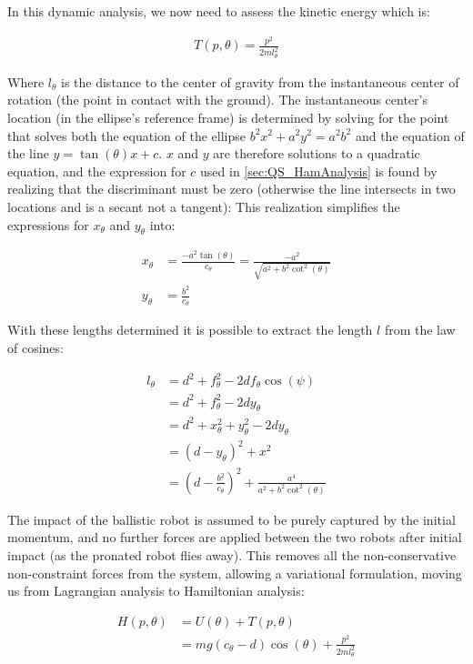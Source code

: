 \documentclass[letterpaper, 10 pt, conference]{ieeeconf}
\begin{document}
In this dynamic analysis, we now need to assess the kinetic energy which is:

\begin{align}
  T(p,\theta) = \frac{p^2}{2ml_\theta^2}
\end{align}

Where $l_\theta$ is the distance to the center of gravity from the instantaneous center of rotation (the point in contact with the ground).
The instantaneous center's location (in the ellipse's reference frame) is determined by solving for the point that solves both the equation of the ellipse $b^2 x^2 + a^2 y^2 = a^2 b^2$ and the equation of the line $y = \tan(\theta) x + c$.
$x$ and $y$ are therefore solutions to a quadratic equation, and the expression for $c$ used in \ref{sec:QS_HamAnalysis} is found by realizing that the discriminant must be zero (otherwise the line intersects in two locations and is a secant not a tangent):
This realization simplifies the expressions for $x_\theta$ and $y_\theta$ into:

\begin{align}
  x_\theta &= \frac{-a^2 \tan(\theta)}{c_\theta} = \frac{-a^2}{\sqrt{a^2 + b^2 \cot^2(\theta)}}\\
  y_\theta &= \frac{b^2}{c_\theta}
\end{align}

With these lengths determined it is possible to extract the length $l$ from the law of cosines:

\begin{align}
  l_\theta &= d^2 + f_\theta^2 - 2 d f_\theta \cos(\psi) \\
  &= d^2 + f_\theta^2 - 2 d y_\theta \\
  &= d^2 + x_\theta^2 + y_\theta^2 - 2 d y_\theta \\
  &= (d - y_\theta)^2 + x^2 \\
  &= \left(d - \frac{b^2}{c_\theta}\right)^2 + \frac{a^4}{a^2 + b^2 \cot^2(\theta)}
\end{align}

The impact of the ballistic robot is assumed to be purely captured by the initial momentum, and no further forces are applied between the two robots after initial impact (as the pronated robot flies away).
This removes all the non-conservative non-constraint forces from the system, allowing a variational formulation, moving us from Lagrangian analysis to Hamiltonian analysis:

\begin{align}
  H(p,\theta) &= U(\theta) + T(p,\theta) \nonumber \\
  &= mg(c_\theta - d) \cos(\theta) + \frac{p^2}{2ml_\theta^2}
\end{align}
\end{document}
